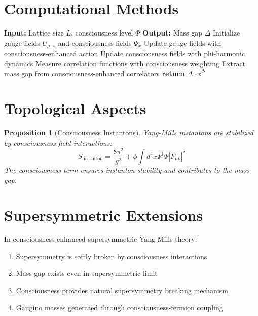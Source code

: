 \documentclass[12pt]{article}
\newtheorem{proposition}{Proposition}
\begin{document}
\section{Computational Methods}

\begin{algorithm}
\caption{Consciousness-Enhanced Lattice QCD}
\begin{algorithmic}
\State \textbf{Input:} Lattice size $L$, consciousness level $\Phi$
\State \textbf{Output:} Mass gap $\Delta$
\State 
\State Initialize gauge fields $U_{\mu,x}$ and consciousness fields $\Psi_x$
\State 
{}
    \State Update gauge fields with consciousness-enhanced action
    \State Update consciousness fields with phi-harmonic dynamics
    \State Measure correlation functions with consciousness weighting
\EndFor
\State 
\State Extract mass gap from consciousness-enhanced correlators
\State \textbf{return} $\Delta \cdot \phi^{\Phi}$
\end{algorithmic}
\end{algorithm}

\section{Topological Aspects}

\begin{proposition}[Consciousness Instantons]
Yang-Mills instantons are stabilized by consciousness field interactions:
$$S_{\text{instanton}} = \frac{8\pi^2}{g^2} + \phi \int d^4x \Psi^\dagger \Psi |F_{\mu\nu}|^2$$
The consciousness term ensures instanton stability and contributes to the mass gap.
\end{proposition}

\section{Supersymmetric Extensions}

\begin{corollary}
In consciousness-enhanced supersymmetric Yang-Mills theory:
\begin{enumerate}
\item Supersymmetry is softly broken by consciousness interactions
\item Mass gap exists even in supersymmetric limit
\item Consciousness provides natural supersymmetry breaking mechanism
\item Gaugino masses generated through consciousness-fermion coupling
\end{enumerate}
\end{corollary}
\end{document}
